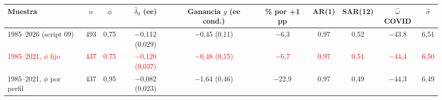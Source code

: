 \begin{tabular}{lccccccccc}
\toprule
Muestra & $n$ & $\phi$ & $\hat\delta_0$ (ee) & Ganancia $g$ (ee cond.) & \% por +1 pp & AR(1) & SAR(12) & $\hat\omega$ COVID & $\hat\sigma$
\\ \midrule
1985--2026 (script 09) & 493 & 0{,}75 & \ensuremath{-}0{,}112 (0{,}029) & \ensuremath{-}0{,}45 (0{,}11) & \ensuremath{-}6{,}3 & 0{,}97 & 0{,}52 & \ensuremath{-}43{,}8 & 6{,}51 \\
\textcolor{red}{1985--2021, $\phi$ fijo} & \textcolor{red}{437} & \textcolor{red}{0{,}75} & \textcolor{red}{\ensuremath{-}0{,}120 (0{,}037)} & \textcolor{red}{\ensuremath{-}0{,}48 (0{,}15)} & \textcolor{red}{\ensuremath{-}6{,}7} & \textcolor{red}{0{,}97} & \textcolor{red}{0{,}51} & \textcolor{red}{\ensuremath{-}44{,}4} & \textcolor{red}{6{,}50} \\
1985--2021, $\phi$ por perfil & 437 & 0{,}95 & \ensuremath{-}0{,}082 (0{,}023) & \ensuremath{-}1{,}64 (0{,}46) & \ensuremath{-}22{,}9 & 0{,}97 & 0{,}49 & \ensuremath{-}44{,}3 & 6{,}49 \\
\bottomrule
\end{tabular}
